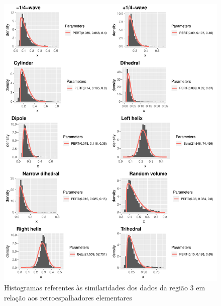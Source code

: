 \documentclass[12pt]{article}
\begin{document}
\begin{figure}[!h]
  \vspace{0.1\linewidth}
  \centering
  \includegraphics[width = 0.8\linewidth]{../../Figures/Report_19_02_27/region3_plots.pdf}
  \caption{Histogramas referentes às similaridades dos dados da região 3 em relação aos retroespalhadores elementares}
  \label{fig:hists3}

\end{figure}

\newpage
\end{document}
